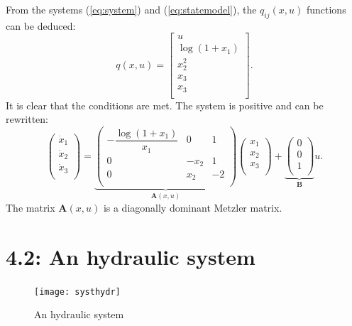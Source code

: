 From the systems (\ref{eq:system}) and (\ref{eq:statemodel}), the $q_{ij}(x,u)$ functions can be deduced:
\begin{equation}
 q(x,u)=
 \begin{bmatrix}
 u\\
 \log(1+x_1)\\
x_2^2\\
x_3\\
x_3\\
 \end{bmatrix}.
\label{eq:qij}
\end{equation}
It is clear that the conditions are met. The system is positive and can be rewritten:
\begin{equation}
\begin{pmatrix}
\dot{x}_1\\
\dot{x}_2\\
\dot{x}_3\\
\end{pmatrix}=
\underbrace{
\begin{pmatrix}
-\dfrac{\log(1+x_1)}{x_1} & 0 & 1\\
0 & -x_2 & 1\\
0 & x_2 & -2\\
\end{pmatrix}}_{\mathbf{A}(x,u)}
\begin{pmatrix}
x_1\\
x_2\\
x_3\\
\end{pmatrix}+\underbrace{
\begin{pmatrix}
0\\
0\\
1\\
\end{pmatrix}}_{\mathbf{B}}u.
\label{eq:Ax}
\end{equation}
The matrix $\mathbf{A}(x,u)$ is a diagonally dominant Metzler matrix.

\section*{4.2: An hydraulic system}
\begin{figure}[h!]
  \centering
  \texttt{[image: systhydr]}
  \caption{An hydraulic system}
  \label{syshydr}
\end{figure}

